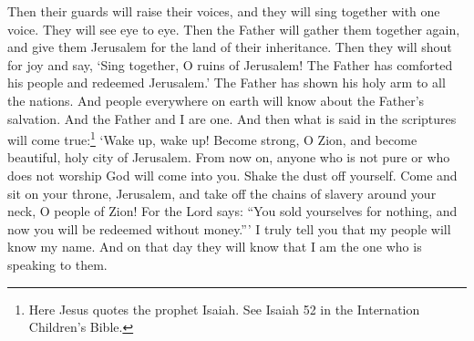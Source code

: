 Then their guards will raise their voices, and they will sing together with one voice. They will see eye to eye.
\bverse \iffalse Then will the Father gather them together again, and give unto them Jerusalem for the land of their inheritance. \fi
Then the Father will gather them together again, and give them Jerusalem for the land of their inheritance.
\bverse \iffalse Then shall they break forth into joy--Sing together, ye waste places of Jerusalem; for the Father hath comforted his people, he hath redeemed Jerusalem. \fi
Then they will shout for joy and say, \lq Sing together, O ruins of Jerusalem! The Father has comforted his people and redeemed Jerusalem.\rq
\bverse \iffalse The Father hath made bare his holy arm in the eyes of all the nations; and all the ends of the earth shall see the salvation of the Father; and the Father and I are one. \fi
The Father has shown his holy arm to all the nations. And people everywhere on earth will know about the Father's salvation. And the Father and I are one.
\bverse \iffalse And then shall be brought to pass that which is written: Awake, awake again, and put on thy strength, O Zion; put on thy beautiful garments, O Jerusalem, the holy city, for henceforth there shall no more come into thee the uncircumcised and the unclean. \fi
And then what is said in the scriptures will come true:\footnote{Here Jesus quotes the prophet Isaiah. See Isaiah 52 in the Internation Children's Bible.} \lq Wake up, wake up! Become strong, O Zion, and become beautiful, holy city of Jerusalem. From now on, anyone who is not pure or who does not worship God will come into you.
\bverse \iffalse Shake thyself from the dust; arise, sit down, O Jerusalem; loose thyself from the bands of thy neck, O captive daughter of Zion. \fi
Shake the dust off yourself. Come and sit on your throne, Jerusalem, and take off the chains of slavery around your neck, O people of Zion!
\bverse \iffalse For thus saith the Lord: Ye have sold yourselves for naught, and ye shall be redeemed without money. \fi
For the Lord says: ``You sold yourselves for nothing, and now you will be redeemed without money.''\rq
\bverse \iffalse Verily, verily, I say unto you, that my people shall know my name; yea, in that day they shall know that I am he that doth speak. \fi
I truly tell you that my people will know my name. And on that day they will know that I am the one who is speaking to them.
\bverse \iffalse And then shall they say: How beautiful upon the mountains are the feet of him that bringeth good tidings unto them, that publisheth peace; that bringeth good tidings unto them of good, that publisheth salvation; that saith unto Zion: Thy God reigneth! \fi
